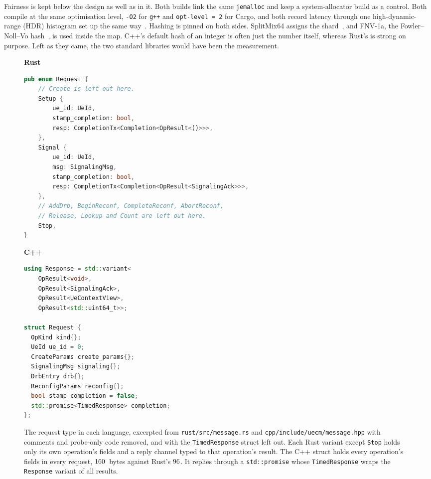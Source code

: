 \documentclass[english,oneside,a4paper,censored,csm,software-track-2020]{HYthesisML}
\begin{document}
Fairness is kept below the design as well as in it. Both builds link the same
\texttt{jemalloc} and keep a system-allocator build as a control. Both compile
at the same optimisation level, \texttt{-O2} for \texttt{g++} and
\texttt{opt-level = 2} for Cargo, and both record latency through one
high-dynamic-range (HDR) histogram set up the same way~\cite{tene_hdrhistogram}.
Hashing is pinned on both sides. SplitMix64 assigns the
shard~\cite{steele2014splitmix}, and FNV-1a, the Fowler--Noll--Vo
hash~\cite{rfc9923}, is used inside the map. C++'s default hash of an integer is
often just the number itself, whereas Rust's is strong on purpose. Left as they
came, the two standard libraries would have been the measurement.

\begin{figure}[!tbp]
\centering
\begin{minipage}[t]{0.595\linewidth}
{\footnotesize\textbf{Rust}}
\begin{lstlisting}[language=Rust]
pub enum Request {
    // Create is left out here.
    Setup {
        ue_id: UeId,
        stamp_completion: bool,
        resp: CompletionTx<Completion<OpResult<()>>>,
    },
    Signal {
        ue_id: UeId,
        msg: SignalingMsg,
        stamp_completion: bool,
        resp: CompletionTx<Completion<OpResult<SignalingAck>>>,
    },
    // AddDrb, BeginReconf, CompleteReconf, AbortReconf,
    // Release, Lookup and Count are left out here.
    Stop,
}
\end{lstlisting}
\end{minipage}\hfill
\begin{minipage}[t]{0.39\linewidth}
{\footnotesize\textbf{C++}}
\begin{lstlisting}[language=C++]
using Response = std::variant<
    OpResult<void>,
    OpResult<SignalingAck>,
    OpResult<UeContextView>,
    OpResult<std::uint64_t>>;

struct Request {
  OpKind kind{};
  UeId ue_id = 0;
  CreateParams create_params{};
  SignalingMsg signaling{};
  DrbEntry drb{};
  ReconfigParams reconfig{};
  bool stamp_completion = false;
  std::promise<TimedResponse> completion;
};
\end{lstlisting}
\end{minipage}
\caption[The request type in each language]{The request type in each language,
excerpted from \texttt{rust/src/message.rs} and
\texttt{cpp/include/uecm/message.hpp} with comments and probe-only code
removed, and with the \texttt{TimedResponse} struct left out. Each Rust variant
except \texttt{Stop} holds only its own operation's fields and a reply channel
typed to that operation's result. The C++ struct holds every
operation's fields in every request, $160$~bytes against Rust's
$96$. It replies through a \texttt{std::promise} whose
\texttt{TimedResponse} wraps the \texttt{Response} variant of all
results.\label{fig:request}}
\end{figure}
\end{document}
